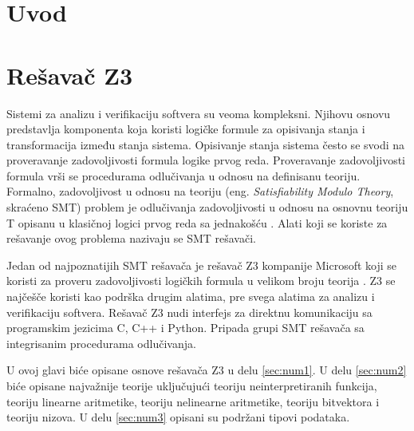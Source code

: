 \documentclass[12pt,oneside]{memoir}
\begin{document}
\frontmatter
\naslovna
\komisija
\apstrakt
\tableofcontents*

\mainmatter

\chapter{Uvod}


\chapter{Rešavač Z3}
\label{chp:razrada}

Sistemi za analizu i verifikaciju softvera su veoma kompleksni. Njihovu osnovu predstavlja komponenta koja koristi logičke formule za opisivanja stanja i transformacija između stanja sistema. Opisivanje stanja sistema često se svodi na proveravanje zadovoljivosti formula logike prvog reda. 
Proveravanje zadovoljivosti formula vrši se procedurama odlučivanja u odnosu na definisanu teoriju. Formalno, zadovoljivost u odnosu na teoriju (eng. \textit{Satisfiability Modulo Theory}, skraćeno SMT) problem je odlučivanja zadovoljivosti u odnosu na osnovnu teoriju T opisanu u klasičnoj logici prvog reda sa jednakošću \cite{Barrett}. Alati koji se koriste za rešavanje ovog problema nazivaju se SMT rešavači. 
\par

Jedan od najpoznatijih SMT rešavača je rešavač Z3 kompanije Microsoft koji se koristi za proveru zadovoljivosti logičkih formula u velikom broju teorija \cite{EfficientSMTSolver}. Z3 se najčešče koristi kao podrška drugim alatima, pre svega alatima za analizu i verifikaciju softvera. Rešavač Z3 nudi interfejs za direktnu komunikaciju sa programskim jezicima C, C++ i Python. Pripada grupi SMT rešavača sa integrisanim procedurama odlučivanja.
\par
U ovoj glavi biće opisane osnove rešavača Z3 u delu \ref{sec:num1}. U delu \ref{sec:num2} biće opisane najvažnije teorije uključujući teoriju neinterpretiranih funkcija, teoriju linearne aritmetike, teoriju nelinearne aritmetike, teoriju bitvektora i teoriju nizova. U delu \ref{sec:num3} opisani su podržani tipovi podataka.  
\end{document}
